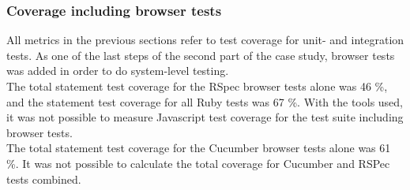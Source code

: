 \subsubsection{Coverage including browser tests}

All metrics in the previous sections refer to test coverage for unit-
and integration tests. As one of the last steps of the second part of
the case study, browser tests was added in order to do system-level
testing.\\

The total statement test coverage for the RSpec browser tests alone was
46 \%, and the statement test coverage for all Ruby tests was 67 \%.
With the tools used, it was not possible to measure Javascript test
coverage for the test suite including browser tests.\\

The total statement test coverage for the Cucumber browser tests alone
was 61 \%. It was not possible to calculate the total coverage for
Cucumber and RSPec tests combined.\\
